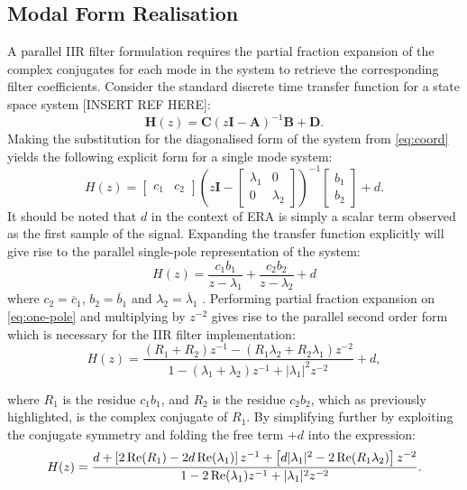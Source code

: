 \subsection{Modal Form Realisation}
\label{sec:modal-form}
A parallel IIR filter formulation requires the partial fraction expansion of the complex conjugates for each mode in the system to retrieve the corresponding filter coefficients. Consider the standard discrete time transfer function for a state space system [INSERT REF HERE]:
\begin{equation}
\label{eq:ss-tf}
    \mathbf{H}(z) = \mathbf{C}(z \mathbf{I} - \mathbf{A})^{-1} \mathbf{B} + \mathbf{D}.
\end{equation}
Making the substitution for the diagonalised form of the system from \eqref{eq:coord} yields the following explicit form for a single mode system:
\begin{equation}
\label{eq:modal}
    H(z) = \begin{bmatrix} c_1 & c_2 \end{bmatrix} \left( z \mathbf{I} - \begin{bmatrix} \lambda_1 & 0 \\ 0 & \lambda_2 \end{bmatrix} \right)^{-1}
    \begin{bmatrix} b_1 \\ b_2 \end{bmatrix} + d.
\end{equation}
It should be noted that $d$ in the context of ERA is simply a scalar term observed as the first sample of the signal. Expanding the transfer function explicitly will give rise to the parallel single-pole representation of the system:
\begin{equation}
\label{eq:one-pole}
    H(z) = \frac{c_1 b_1}{z - \lambda_1} + \frac{c_2 b_2}{z - \lambda_2} + d
\end{equation}
where $c_2 = \overline{c}_1$, $b_2 = \overline{b}_1$ and $\lambda_2 = \overline{\lambda}_1$ \cite{smith-book}.
Performing partial fraction expansion on \eqref{eq:one-pole} and multiplying by $z^{-2}$ gives rise to the parallel second order form which is necessary for the IIR filter implementation:
\begin{equation}
\label{eq:second-order}
    H(z) = \frac{(R_1 + R_2)z^{-1} - (R_1 \lambda_2 + R_2 \lambda_1)z^{-2}}{1 - (\lambda_1 + \lambda_2)z^{-1} + |\lambda_1|^{2}z^{-2}} + d,
\end{equation}

where $R_1$ is the residue $c_1 b_1$, and $R_2$ is the residue $c_2 b_2$, which as previously highlighted, is the complex conjugate of $R_1$.
By simplifying further by exploiting the conjugate symmetry and folding the free term $+d$ into the expression:
\begin{equation}
\label{eq:full-parallel}
    H(z) = \frac{d + \left[2\operatorname{Re}(R_1) - 2d\operatorname{Re}(\lambda_1)\right]z^{-1} + \left[d|\lambda_1|^2 - 2\operatorname{Re}(R_1\lambda_2)\right]z^{-2}}{1 - 2\operatorname{Re}(\lambda_1)z^{-1} + |\lambda_1|^2 z^{-2}}.
\end{equation}

